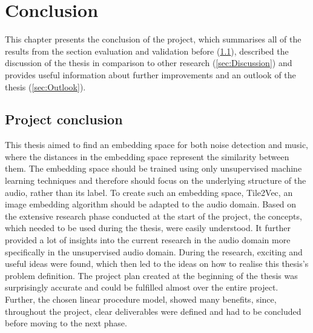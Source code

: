 \chapter{Conclusion}
\label{ch:Conclusion}
This chapter presents the conclusion of the project, which summarises all of the results from the section evaluation and validation before (\ref{sec:Project-Conclusion}), described the discussion of the thesis in comparison to other research (\ref{sec:Discussion}) and provides useful information about further improvements and an outlook of the thesis (\ref{sec:Outlook}).

\section{Project conclusion}
\label{sec:Project-Conclusion}
This thesis aimed to find an embedding space for both noise detection and music, where the distances in the embedding space represent the similarity between them. The embedding space should be trained using only unsupervised machine learning techniques and therefore should focus on the underlying structure of the audio, rather than its label. To create such an embedding space, Tile2Vec, an image embedding algorithm should be adapted to the audio domain. 
\newline
\newline
Based on the extensive research phase conducted at the start of the project, the concepts, which needed to be used during the thesis, were easily understood. It further provided a lot of insights into the current research in the audio domain more specifically in the unsupervised audio domain. During the research, exciting and useful ideas were found, which then led to the ideas on how to realise this thesis's problem definition. The project plan created at the beginning of the thesis was surprisingly accurate and could be fulfilled almost over the entire project. Further, the chosen linear procedure model, showed many benefits, since, throughout the project, clear deliverables were defined and had to be concluded before moving to the next phase. 
\newline
\newline
